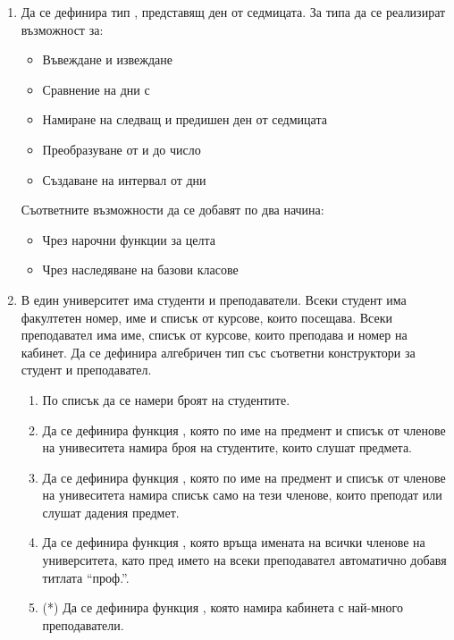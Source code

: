 \begin{enumerate}[]

	\item Да се дефинира тип , представящ ден от седмицата. За типа да се реализират възможност за:
	\begin{itemize}
		\item Въвеждане и извеждане
		\item Сравнение на дни с \code{==,<,>}
		\item Намиране на следващ и предишен ден от седмицата
		\item Преобразуване от и до число
		\item Създаване на интервал от дни
	\end{itemize}
	Съответните възможности да се добавят по два начина:
	\begin{itemize}
		\item Чрез нарочни функции за целта
		\item Чрез наследяване на базови класове
	\end{itemize}


	\item В един университет има студенти и преподаватели. Всеки студент има факултетен номер, име и списък от курсове, които посещава. Всеки преподавател има име, списък от курсове, които преподава и номер на кабинет. Да се дефинира алгебричен тип  със съответни конструктори за студент и преподавател.
	
	\begin{enumerate}[label=\alph*)]
		\item По списък \code{[Member]} да се намери броят на студентите.
		\item Да се дефинира функция , която по име на предмент и списък от членове на унивеситета намира броя на студентите, които слушат предмета.
		\item Да се дефинира функция , която по име на предмент и списък от членове на унивеситета намира списък само на тези членове, които преподат или слушат дадения предмет.
		\item Да се дефинира функция , която връща имената на всички членове на университета, като пред името на всеки преподавател автоматично добавя титлата ``проф.''.
		\item(*) Да се дефинира функция , която намира кабинета с най-много преподаватели.
	\end{enumerate}

\end{enumerate}

